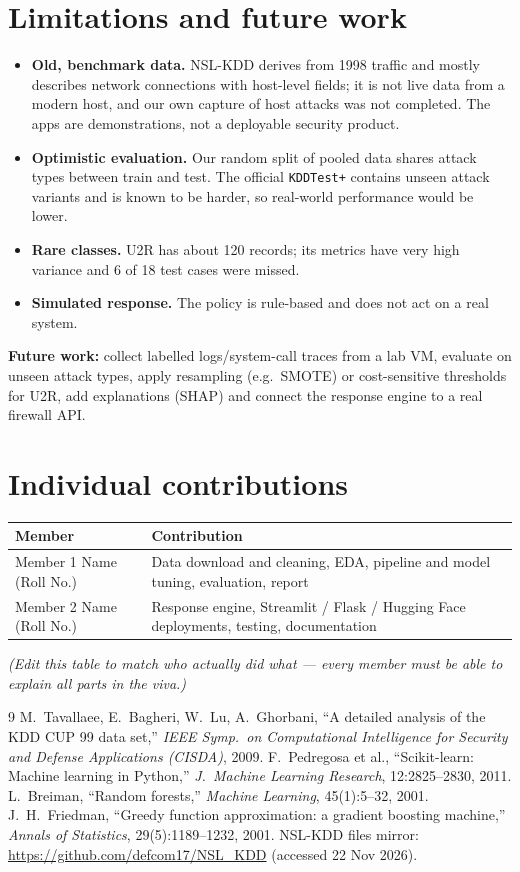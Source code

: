 \documentclass[10pt,a4paper]{article}
\newcommand{\memberA}{Member 1 Name (Roll No.)}
\newcommand{\memberB}{Member 2 Name (Roll No.)}
\begin{document}
\section{Limitations and future work}
\begin{itemize}
\item \textbf{Old, benchmark data.} NSL-KDD derives from 1998 traffic and mostly describes network connections with host-level fields; it is not live data from a modern host, and our own capture of host attacks was not completed. The apps are demonstrations, not a deployable security product.
\item \textbf{Optimistic evaluation.} Our random split of pooled data shares attack types between train and test. The official \texttt{KDDTest+} contains unseen attack variants and is known to be harder, so real-world performance would be lower.
\item \textbf{Rare classes.} U2R has about 120 records; its metrics have very high variance and 6 of 18 test cases were missed.
\item \textbf{Simulated response.} The policy is rule-based and does not act on a real system.
\end{itemize}
\textbf{Future work:} collect labelled logs/system-call traces from a lab VM, evaluate on unseen attack types, apply resampling (e.g.\ SMOTE) or cost-sensitive thresholds for U2R, add explanations (SHAP) and connect the response engine to a real firewall API.

\section*{Individual contributions}
\begin{center}\begin{tabular}{p{3.4cm}p{12.2cm}}\toprule
Member & Contribution\\\midrule
\memberA & Data download and cleaning, EDA, pipeline and model tuning, evaluation, report\\
\memberB & Response engine, Streamlit / Flask / Hugging Face deployments, testing, documentation\\\bottomrule
\end{tabular}\end{center}
{\small\textit{(Edit this table to match who actually did what --- every member must be able to explain all parts in the viva.)}}

\begin{thebibliography}{9}\small
{} M.~Tavallaee, E.~Bagheri, W.~Lu, A.~Ghorbani, ``A detailed analysis of the KDD CUP 99 data set,'' \textit{IEEE Symp.\ on Computational Intelligence for Security and Defense Applications (CISDA)}, 2009.
 F.~Pedregosa et al., ``Scikit-learn: Machine learning in Python,'' \textit{J.\ Machine Learning Research}, 12:2825--2830, 2011.
 L.~Breiman, ``Random forests,'' \textit{Machine Learning}, 45(1):5--32, 2001.
 J.~H.~Friedman, ``Greedy function approximation: a gradient boosting machine,'' \textit{Annals of Statistics}, 29(5):1189--1232, 2001.
 NSL-KDD files mirror: \url{https://github.com/defcom17/NSL_KDD} (accessed 22 Nov 2026).
\end{thebibliography}
\end{document}
